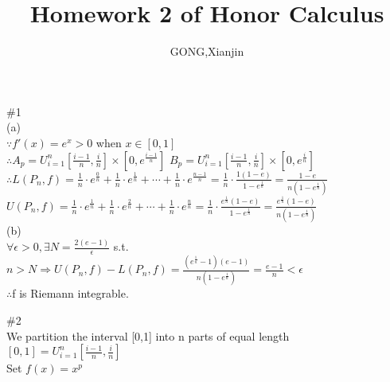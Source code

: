 \documentclass{article}
\author{GONG,Xianjin}
\title{Homework 2 of Honor Calculus}
\begin{document}
\maketitle

\vspace{3.5mm}

\textcolor[rgb]{0.00,0.00,0.50}{\#1}\\

(a)\\

$\because$\qquad$f'(x)=e^x>0$ when $x\in[0,1]$\\

$\therefore$\qquad$\displaystyle A_p=U_{i=1}^{n}\left[\frac{i-1}{n},\frac{i}{n}\right]\times \left[0,e^{\frac{i-1}{n}}\right]$ \qquad $\displaystyle B_p=U_{i=1}^{n}\left[\frac{i-1}{n},\frac{i}{n}\right]\times\left[0,e^{\frac{i}{n}}\right]$\\

$\therefore$\qquad$\displaystyle L(P_n,f)=\frac{1}{n}\cdot e^{\frac{0}{n}}+\frac{1}{n}\cdot e^{\frac{1}{n}}+\cdots+\frac{1}{n}\cdot e^{\frac{n-1}{n}}=\frac{1}{n}\cdot\frac{1(1-e)}{1-e^{\frac{1}{n}}}=\frac{1-e}{n(1-e^{\frac{1}{n}})}$\\

\qquad\quad $\displaystyle U(P_n,f)=\frac{1}{n}\cdot e^{\frac{1}{n}}+\frac{1}{n}\cdot e^{\frac{2}{n}}+\cdots+\frac{1}{n}\cdot e^{\frac{n}{n}}=\frac{1}{n}\cdot\frac{e^{\frac{1}{n}}(1-e)}{1-e^{\frac{1}{n}}}=\frac{e^{\frac{1}{n}}(1-e)}{n(1-e^{\frac{1}{n}})}$\\

(b)\\

$\displaystyle\forall\epsilon>0, \exists N=\frac{2(e-1)}{\epsilon}$ s.t.\\

$\displaystyle n>N\Rightarrow U(P_n,f)-L(P_n,f)=\frac{(e^{\frac{1}{n}}-1)(e-1)}{n(1-e^{\frac{1}{n}})}=\frac{e-1}{n}<\epsilon$\\

$\therefore$\qquad f is Riemann integrable.\\

\vskip 2cm

\textcolor[rgb]{0.00,0.00,0.50}{\#2}\\

We partition the interval [0,1] into n parts of equal length \qquad $\displaystyle [0,1]=U_{i=1}^{n}[\frac{i-1}{n},\frac{i}{n}]$\\

Set $f(x)=x^p$\\
\end{document}
